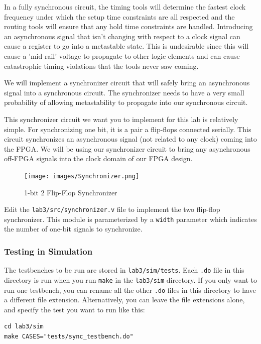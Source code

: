 \documentclass[11pt]{article}
\begin{document}
In a fully synchronous circuit, the timing tools will determine the fastest clock frequency under which the setup time constraints are all respected and the routing tools will ensure that any hold time constraints are handled. Introducing an asynchronous signal that isn't changing with respect to a clock signal can cause a register to go into a metastable state. This is undesirable since this will cause a 'mid-rail' voltage to propagate to other logic elements and can cause catastrophic timing violations that the tools never saw coming.

We will implement a synchronizer circuit that will safely bring an asynchronous signal into a synchronous circuit. The synchronizer needs to have a very small probability of allowing metastability to propagate into our synchronous circuit.

This synchronizer circuit we want you to implement for this lab is relatively simple. For synchronizing one bit, it is a pair a flip-flops connected serially. This circuit synchronizes an asynchronous signal (not related to any clock) coming into the FPGA. We will be using our synchronizer circuit to bring any asynchronous off-FPGA signals into the clock domain of our FPGA design.

\begin{figure}[H]
	\vspace{0.5cm}
	\centerline{\texttt{[image: images/Synchronizer.png]}}
	\caption{1-bit 2 Flip-Flop Synchronizer}
\end{figure}

Edit the \verb|lab3/src/synchronizer.v| file to implement the two flip-flop synchronizer. This module is parameterized by a \verb|width| parameter which indicates the number of one-bit signals to synchronize.

\subsubsection{Testing in Simulation}
The testbenches to be run are stored in \verb|lab3/sim/tests|. Each \verb|.do| file in this directory is run when you run \verb|make| in the \verb|lab3/sim| directory. If you only want to run one testbench, you can rename all the other \verb|.do| files in this directory to have a different file extension. Alternatively, you can leave the file extensions alone, and specify the test you want to run like this:

\begin{verbatim}
cd lab3/sim
make CASES="tests/sync_testbench.do"
\end{verbatim}
\end{document}
